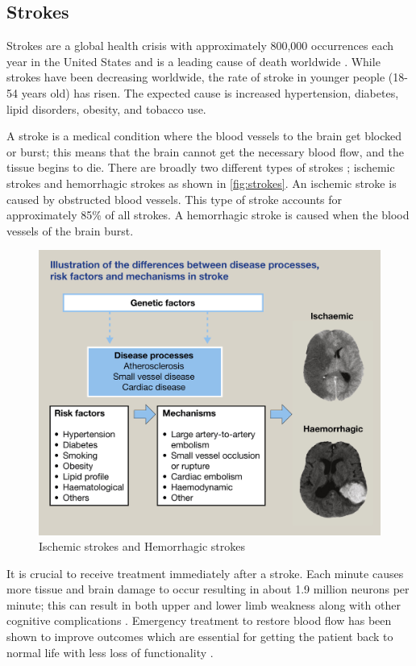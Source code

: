 \subsection{Strokes}
Strokes are a global health crisis with approximately 800,000 occurrences each year in the United States and is a leading cause of death worldwide \cite{george2017cdc} \cite{murphy2020stroke} \cite{feigin2015update}. While strokes have been decreasing worldwide, the rate of stroke in younger people (18-54 years old) has risen. The expected cause is increased hypertension, diabetes, lipid disorders, obesity, and tobacco use. 

A stroke is a medical condition where the blood vessels to the brain get blocked or burst; this means that the brain cannot get the necessary blood flow, and the tissue begins to die. There are broadly two different types of strokes \cite{perna2015rehabilitation}; ischemic strokes and hemorrhagic strokes as shown in \autoref{fig:strokes}. An ischemic stroke is caused by obstructed blood vessels. This type of stroke accounts for approximately 85\% of all strokes. A hemorrhagic stroke is caused when the blood vessels of the brain burst.  

\begin{figure}
    \centering
    \includegraphics[scale=0.85]{images/background/stroke.jpg}
    \caption[Ischemic strokes and Hemorrhagic strokes]{Ischemic strokes and Hemorrhagic strokes \cite{murphy2020stroke}}
    \label{fig:strokes}
\end{figure}


It is crucial to receive treatment immediately after a stroke. Each minute causes more tissue and brain damage to occur \cite{saver2006time} resulting in about 1.9 million neurons per minute; this can result in both upper and lower limb weakness along with other cognitive complications \cite{pennycott2012towards}. Emergency treatment to restore blood flow has been shown to improve outcomes which are essential for getting the patient back to normal life with less loss of functionality \cite{goyal2016endovascular}.  